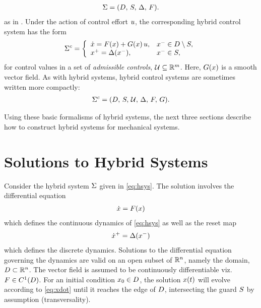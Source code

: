 \begin{align*}
  \Sigma = (D, \, S, \, \Delta, \, F).
\end{align*}
as in \cite{Sinnet2009}.
%
Under the action of control effort $u$, the corresponding hybrid control
system has the form
%
\begin{align}
  \Sigma^{c} = \left\{
  \begin{array}{l l}
    {\dot {x}} = F(x) + G(x) \, u, & x^{-} \in D \setminus S,\\
    x^{+} = \Delta(x^{-}), & x^{-} \in S,
  \end{array}\right.
  \label{eq:hcsys}
\end{align}
%
for control values in a set of {\em admissible controls}, $\mathcal{U} \subseteq \mathbb{R}^{m}$.
%
Here, $G(x)$ is a smooth vector field.
%
As with hybrid systems, hybrid control systems are sometimes written more
compactly:
\begin{align*}
  \Sigma^{c} = (D, \, S, \, \mathcal{U}, \, \Delta, \, F, \, G).
\end{align*}

Using these basic formalisms of hybrid systems, the next three sections describe
how to construct hybrid systems for mechanical systems.

\section{Solutions to Hybrid Systems} \label{sec:hsys-sol}
Consider the hybrid system $\Sigma$ given in \eqref{eq:hsys}.
%
The solution involves the differential equation
\begin{align}
  \label{eq:xdot}
  {\dot {x}} = F(x)
\end{align}
which defines the continuous dynamics of \eqref{eq:hsys} as well as the reset
map
\begin{align}
  \label{eq:rmap}
  {\dot {x}}^{+} = \Delta(x^{-})
\end{align}
which defines the discrete dynamics.
%
Solutions to the differential equation governing the dynamics are valid on an
open subset of $\mathbb{R}^{n}$, namely the domain, $D \subset \mathbb{R}^{n}$.
%
The vector field is assumed to be continuously differentiable viz. $F \in
C^{1}(D)$.
%
For an initial condition $x_{0} \in D$, the solution $x(t)$ will evolve
according to \eqref{eq:xdot} until it reaches the edge of $D$, intersecting
the guard $S$ by assumption (transversality).


